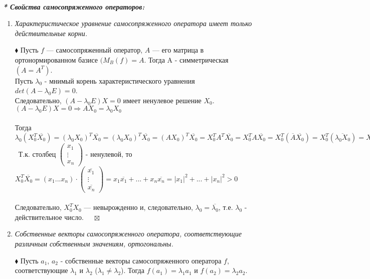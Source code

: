 \documentclass[a4paper, 12pt]{report}
\begin{document}
	\textit{ \textbf{\\* Свойства самосопряженного операторов:}}
	\begin{enumerate}
		\item \textit{Характеристическое уравнение самосопряженного оператора имеет только действительные корни.}
		\par\bigskip
		$\blacklozenge$ 
		Пусть $f$ --- самосопряженный оператор, $A$ --- его матрица в ортонормированном базисе $(M_B(f)=A$. Тогда A - симметрическая $(A=A^T)$.\\
		Пусть $\lambda_0$ - мнимый корень характеристического уравнения $det(A-\lambda_0 E)=0$.\\
		Следовательно, $(A-\lambda_0 E)X=0$ имеет ненулевое решение $X_0$.\\
		$(A-\lambda_0 E)X=0 \Rightarrow AX_0=\lambda_0X_0$\\\\
		Тогда $\lambda_0(X_0^T\overline{X_0})=(\lambda_0X_0)^T\overline{X_0}=(\lambda_0X_0)^T\overline{X_0}=(AX_0)^T\overline{X_0}=X_0^TA^T\overline{X_0}=X_0^TA\overline{X_0}=X_0^T(\overline{A} \overline{X_0})=X_0^T(\overline{\lambda_0X_0})=X_0^T(\overline{\lambda_0}\cdot \overline{X_0})=\overline{\lambda_0}(X_0^T\overline{X_0})$\\\
		Т.к. столбец $\begin{pmatrix}x_1\\\vdots \\ x_n\end{pmatrix}$ - ненулевой, то $X_0^T\overline{X_0}=(x_1 ...x_n)\cdot \begin{pmatrix}\overline{x_1}\\\vdots \\ \overline{x_n}\end{pmatrix}=x_1\overline{x_1}+...+x_n\overline{x_n}=|x_1|^2+...+|x_n|^2>0$\\\\
		Следовательно, $X_0^TX_0$ --- невырожденно и, следовательно, $\lambda_0=\overline{\lambda_0}$, т.е. $\lambda_0$ - действительное число.
		$\quad\boxtimes$
		\item \textit{Собственные векторы самосопряженного оператора, соответствующие различным собственным значениям, ортогональны.}
		\par\bigskip
		$\blacklozenge$
		Пусть $a_1$, $a_2$ - собственные векторы самосопряженного оператора $f$, соответствующие
		$\lambda_1$ и $\lambda_2$ ($\lambda_1 \neq \lambda_2$).
		Тогда $f(a_1)=\lambda_1a_1$ и $f(a_2)=\lambda_2a_2$.\\\\

\end{enumerate}
\end{document}
